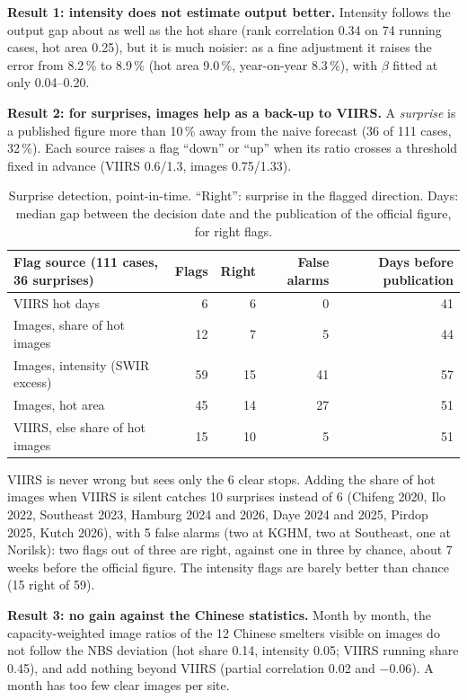 \documentclass[10pt,a4paper]{article}
\begin{document}
\textbf{Result 1: intensity does not estimate output better.} Intensity follows the output gap about as well as the hot share (rank correlation 0.34 on 74 running cases, hot area 0.25), but it is much noisier: as a fine adjustment it raises the error from 8.2\,\% to 8.9\,\% (hot area 9.0\,\%, year-on-year 8.3\,\%), with $\beta$ fitted at only 0.04--0.20.

\textbf{Result 2: for surprises, images help as a back-up to VIIRS.} A \emph{surprise} is a published figure more than 10\,\% away from the naive forecast (36 of 111 cases, 32\,\%). Each source raises a flag ``down'' or ``up'' when its ratio crosses a threshold fixed in advance (VIIRS 0.6/1.3, images 0.75/1.33).

\begin{table}[H]
\centering\small
\begin{tabularx}{\textwidth}{@{}X r r r r@{}}
\toprule
\textbf{Flag source (111 cases, 36 surprises)} & \textbf{Flags} & \textbf{Right} & \textbf{False alarms} & \textbf{Days before publication}\\
\midrule
VIIRS hot days & 6 & 6 & 0 & 41\\
Images, share of hot images & 12 & 7 & 5 & 44\\
Images, intensity (SWIR excess) & 59 & 15 & 41 & 57\\
Images, hot area & 45 & 14 & 27 & 51\\
VIIRS, else share of hot images & 15 & 10 & 5 & 51\\
\bottomrule
\end{tabularx}
\caption{Surprise detection, point-in-time. ``Right'': surprise in the flagged direction. Days: median gap between the decision date and the publication of the official figure, for right flags.}
\label{tab:surprise}
\end{table}

VIIRS is never wrong but sees only the 6 clear stops. Adding the share of hot images when VIIRS is silent catches 10 surprises instead of 6 (Chifeng 2020, Ilo 2022, Southeast 2023, Hamburg 2024 and 2026, Daye 2024 and 2025, Pirdop 2025, Kutch 2026), with 5 false alarms (two at KGHM, two at Southeast, one at Norilsk): two flags out of three are right, against one in three by chance, about 7 weeks before the official figure. The intensity flags are barely better than chance (15 right of 59).

\textbf{Result 3: no gain against the Chinese statistics.} Month by month, the capacity-weighted image ratios of the 12 Chinese smelters visible on images do not follow the NBS deviation (hot share 0.14, intensity 0.05; VIIRS running share 0.45), and add nothing beyond VIIRS (partial correlation 0.02 and $-0.06$). A month has too few clear images per site.
\end{document}
